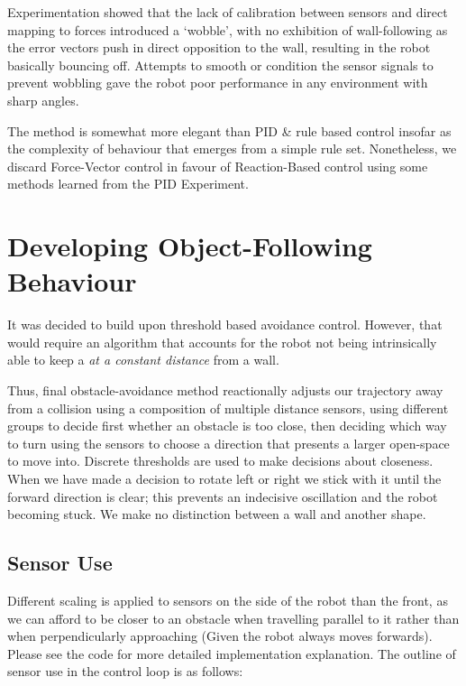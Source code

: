 \documentclass[11pt, a4paper]{article}
\begin{document}
Experimentation showed that the lack of calibration between sensors and 
direct mapping to forces introduced a `wobble', with no exhibition of 
wall-following as the error vectors push in direct opposition to the wall, 
resulting in the robot basically bouncing off. Attempts to smooth or condition the 
sensor signals to prevent wobbling gave the robot poor performance in any environment 
with sharp angles.

The method is somewhat more elegant than PID \& rule based control insofar 
as the complexity of behaviour that emerges from a simple rule set. Nonetheless, we 
discard Force-Vector control in favour of Reaction-Based control using some methods 
learned from the PID Experiment.



\section{Developing Object-Following Behaviour}

It was decided to build upon threshold based avoidance control. However, 
that would require an algorithm that accounts for the robot not being intrinsically
able to keep a  \emph{at a constant distance} from a wall.

Thus, final obstacle-avoidance method reactionally adjusts our trajectory away from a 
collision using a composition of multiple distance sensors, using different groups to 
decide first whether an obstacle is too close, then deciding which way to turn using 
the sensors to choose a direction that presents a larger open-space to move into.
Discrete thresholds are used to make decisions about closeness. When we have made a 
decision to rotate left or right we stick with it until the forward direction is clear; 
this prevents an indecisive oscillation and the robot becoming stuck. We make no 
distinction between a wall and another shape.

\subsection{Sensor Use}

Different scaling is applied to sensors on the side of the robot than the front, as we 
can afford to be closer to an obstacle when travelling parallel to it rather than 
when perpendicularly approaching (Given the robot always moves forwards). Please 
see the code for more detailed implementation explanation. The outline of sensor use in 
the control loop is as follows:
\end{document}

